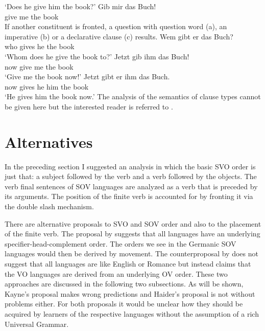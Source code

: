 \glt `Does he give him the book?'
\ex 
\gll Gib mir das Buch!\\
     give me the book\\
\zl
If another constituent is fronted, a question with question word (a), an imperative
(b) or a declarative clause (c) results.
\eal
\ex 
\gll Wem gibt er das Buch?\\
     who gives he the book\\
\glt `Whom does he give the book to?'
\ex 
\gll Jetzt gib ihm das Buch!\\
     now give me the book\\
\glt `Give me the book now!'
\ex 
\gll Jetzt gibt er ihm das Buch.\\
     now gives he him the book\\
\glt `He gives him the book now.'
\zl
The analysis of the semantics of clause types cannot be given here but the interested reader is
referred to .

\section{Alternatives}


In the preceding section I suggested an analysis in which the basic SVO order is just that: a
subject followed by the verb and a verb followed by the objects. The verb final sentences of SOV
languages are analyzed as a verb that is preceded by its arguments. The position of the finite verb
is accounted for by fronting it via the double slash mechanism.

There are alternative proposals to SVO and SOV order and also to the placement of the finite
verb. The proposal by \citet{Kayne94a-u} suggests that all languages have an underlying
specifier-head-complement order. The orders we see in the Germanic SOV languages would then be
derived by movement. The counterproposal by \citet{Haider2000a,Haider2017b-u} does not suggest that all languages are
like English or Romance but instead claims that the VO languages are derived from an underlying OV
order. These two approaches are discussed in the following two subsections. As will be shown,
Kayne's proposal makes wrong predictions and Haider's proposal is not without problems either. For
both proposals it would be unclear how they should be acquired by learners of the respective
languages without the assumption of a rich Universal Grammar.

